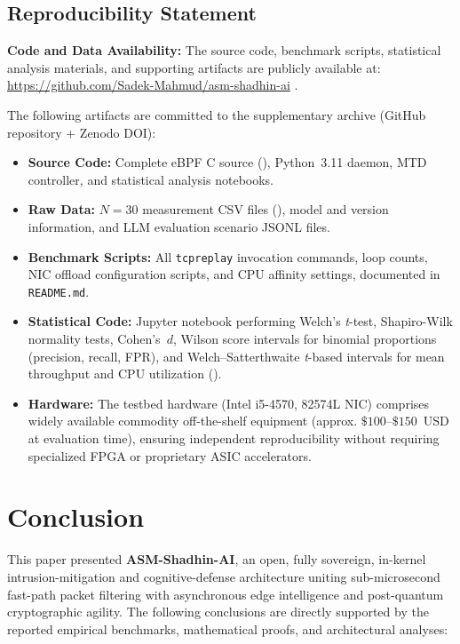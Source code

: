 \documentclass[journal]{IEEEtran}
\renewcommand{\_}{\textunderscore\allowbreak}
\begin{document}
\subsection{Reproducibility Statement}
\textbf{Code and Data Availability:} The source code, benchmark scripts, statistical analysis materials, and supporting artifacts are publicly available at: \url{https://github.com/Sadek-Mahmud/asm-shadhin-ai} \cite{asmshadhinai2026code}.

The following artifacts are committed to the supplementary archive
(GitHub repository + Zenodo DOI):
\begin{itemize}
  \item \textbf{Source Code:} Complete eBPF C source (),
    Python~3.11 daemon, MTD controller, and statistical analysis notebooks.

  \item \textbf{Raw Data:} $N=30$ measurement CSV files
    (), model and version
    information, and LLM evaluation scenario JSONL files.

  \item \textbf{Benchmark Scripts:} All \texttt{tcpreplay} invocation commands,
    loop counts, NIC offload configuration scripts, and CPU affinity settings,
    documented in \texttt{README.md}.

  \item \textbf{Statistical Code:} Jupyter notebook performing Welch's
    \textit{t}-test, Shapiro-Wilk normality tests, Cohen's~$d$, Wilson score
    intervals for binomial proportions (precision, recall, FPR), and
    Welch--Satterthwaite \textit{t}-based intervals for mean throughput and CPU utilization
    ().

  \item \textbf{Hardware:} The testbed hardware (Intel i5-4570, 82574L NIC) comprises
    widely available commodity off-the-shelf equipment (approx. $\$100$--$\$150$~USD
    at evaluation time), ensuring independent reproducibility without requiring
    specialized FPGA or proprietary ASIC accelerators.
\end{itemize}

\section{Conclusion}
This paper presented \textbf{ASM-Shadhin-AI}, an open, fully sovereign,
in-kernel intrusion-mitigation and cognitive-defense architecture uniting
sub-microsecond fast-path packet filtering with asynchronous edge intelligence and
post-quantum cryptographic agility. The following conclusions are directly supported by
the reported empirical benchmarks, mathematical proofs, and architectural analyses:
\end{document}
